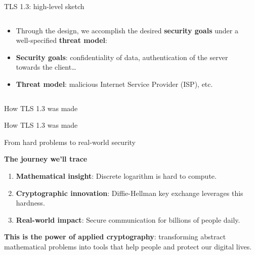 \documentclass[aspectratio=169, lualatex, handout]{beamer}
\begin{document}
\begin{frame}{TLS 1.3: high-level sketch}
	\begin{columns}[c]
		\begin{column}{0.5\textwidth}
			\begin{itemize}[<+->]
				\item Through the design, we accomplish the desired \textbf{security
					      goals} under a well-specified \textbf{threat model}:
				\item \textbf{Security goals}: confidentiality of data, authentication
				      of the server towards the client\ldots
				\item \textbf{Threat model}: malicious Internet Service Provider (ISP),
				      etc.
			\end{itemize}
		\end{column}

		\begin{column}{0.5\textwidth}
		\end{column}
	\end{columns}
\end{frame}

\begin{frame}{How TLS 1.3 was made}
\end{frame}

\begin{frame}{How TLS 1.3 was made}
\end{frame}

\begin{frame}{From hard problems to real-world security}
	\begin{center}
		\Large\textbf{The journey we'll trace}
	\end{center}
	\vspace{0.5cm}
	\begin{enumerate}[<+->]
		\item \textbf{Mathematical insight}: Discrete logarithm is hard to compute.
		\item \textbf{Cryptographic innovation}: Diffie-Hellman key exchange leverages this hardness.
		\item \textbf{Real-world impact}: Secure communication for billions of people daily.
	\end{enumerate}
	\vspace{1cm}
	\textbf{This is the power of applied cryptography}: transforming abstract mathematical problems into tools that help people and protect our digital lives.
\end{frame}
\end{document}
